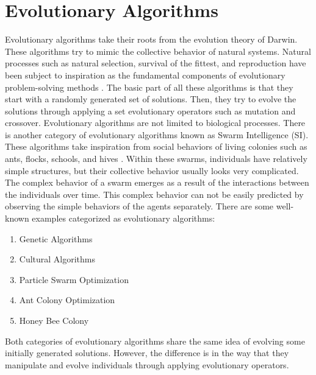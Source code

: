 \section{Evolutionary Algorithms}
Evolutionary algorithms take their roots from the evolution theory of Darwin. These algorithms try to mimic the collective behavior of natural systems. Natural processes such as natural selection, survival of the fittest, and reproduction have been subject to inspiration as the fundamental components of evolutionary problem-solving methods \citet{burke2005search}. The basic part of all these algorithms is that they start with a randomly generated set of solutions. Then, they try to evolve the solutions through applying a set evolutionary operators such as mutation and crossover. \newline
Evolutionary algorithms are not limited to biological processes. There is another category of evolutionary algorithms known as Swarm Intelligence (SI). These algorithms take inspiration from social behaviors of living colonies such as ants, flocks, schools, and hives \citet{kennedy2001swarm}. Within these swarms, individuals have relatively simple structures, but their collective behavior usually looks very complicated. The complex behavior of a swarm emerges as a result of the interactions between the individuals over time. This complex behavior can not be easily predicted by observing the simple behaviors of the agents separately. \newline
There are some well-known examples categorized as evolutionary algorithms:
\begin{enumerate}
	\item Genetic Algorithms
	\item Cultural Algorithms
	\item Particle Swarm Optimization
	\item Ant Colony Optimization
	\item Honey Bee Colony
\end{enumerate}
Both categories of evolutionary algorithms share the same idea of evolving some initially generated solutions. However, the difference is in the way that they manipulate and evolve individuals through applying evolutionary operators. 

